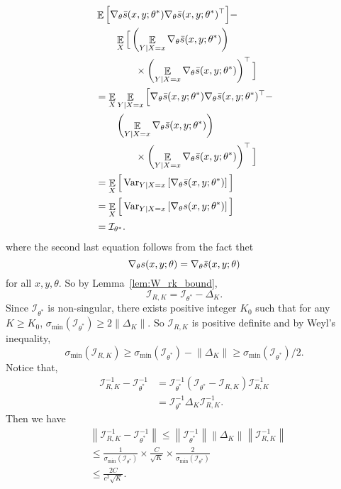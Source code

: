 \documentclass[11pt,a4paper]{article}
\DeclareMathOperator{\E}{\mathbb{E}}
\newcommand{\var}{\operatorname{Var}}
\newcommand{\gtheta}{\ensuremath \nabla_{\theta}}
\newcommand{\str}[3]{s(#1, #2; #3)}
\newcommand{\ssf}[3]{\bar{s}(#1, #2; #3)}
\newcommand{\vnorm}[1]{\left\| #1 \right\|}
\newcommand{\fisher}{\mathcal{I}_{\theta^*}}
\begin{document}
\begin{equation*}
\begin{aligned}
& \E \Big[\gtheta \ssf{x}{y}{\theta^*}\gtheta \ssf{x}{y}{\theta^*}^\top\Big] - \\
& ~~~~~~\E_X \Big[\left(\E_{Y|X = x}\gtheta \ssf{x}{y}{\theta^*}\right)  \\ 
& ~~~~~~~~~~~~\times \left(\E_{Y|X = x}\gtheta \ssf{x}{y}{\theta^*}\right)^\top \Big] \\
& = \E_X \E_{Y|X = x}  \Big[ \gtheta \ssf{x}{y}{\theta^*}\gtheta \ssf{x}{y}{\theta^*}^\top -  \\ 
&  ~~~~~~ \left(\E_{Y|X = x}\gtheta \ssf{x}{y}{\theta^*}\right)  \\ 
& ~~~~~~~~~~~~\times \left(\E_{Y|X = x}\gtheta \ssf{x}{y}{\theta^*}\right)^\top \Big ] \\
& = \E_X \Big[\var_{Y|X=x} \left[ \gtheta \ssf{x}{y}{\theta^*} \right] \Big] \\
& = \E_X \Big[\var_{Y|X=x} \left[ \gtheta \str{x}{y}{\theta^*} \right] \Big] \\
& = \fisher.
\end{aligned}
\end{equation*}
where the second last equation follows from the fact thet 
\[
\gtheta \str{x}{y}{\theta} = \gtheta \ssf{x}{y}{\theta}
\]
for all $x, y, \theta$. So by Lemma~\ref{lem:W_rk_bound}, 
\[
\mathcal{I}_{R, K} = \fisher - \Delta_K.
\]
Since $\fisher$ is non-singular, there exists positive integer $K_0$ such that for any $K\geq K_0$, $\sigma_{\min}(\fisher)\geq 2\|\Delta_K\|$. So $\mathcal{I}_{R, K}$ is positive definite and by Weyl's inequality, 
\[
\sigma_{\min}(\mathcal{I}_{R, K}) \geq \sigma_{\min}(\fisher) -  \vnorm{\Delta_K} \geq \sigma_{\min}(\fisher)/2. 
\]
Notice that,
\begin{equation*}
\begin{aligned}
\mathcal{I}_{R, K}^{-1} - \fisher^{-1}  & = \fisher^{-1} (\fisher - \mathcal{I}_{R, K}) \mathcal{I}_{R, K}^{-1} \\
&  = \fisher^{-1} \Delta_K \mathcal{I}_{R, K}^{-1}. 
\end{aligned}
\end{equation*}
Then we have 
\begin{equation*}
\begin{aligned}
& \vnorm{\mathcal{I}_{R, K}^{-1} - \fisher^{-1}} \leq \vnorm{\fisher^{-1}} \vnorm{\Delta_K} \vnorm{\mathcal{I}_{R, K}^{-1}}\\
& \leq  \frac{1}{\sigma_{\min}(\fisher)}\times \frac{C}{\sqrt{K}} \times \frac{2}{\sigma_{\min}(\fisher)}  \\
& \leq  \frac{2C}{c^2 \sqrt{K}}.
\end{aligned}
\end{equation*}
\end{document}
